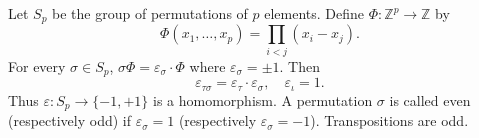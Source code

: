 Let $S_p$ be the group of permutations of $p$ elements. Define $\Phi: \mathbb{Z}^p \to \mathbb{Z}$ by
$$\Phi(x_1, \ldots, x_p) = \prod_{i < j} (x_i - x_j).$$
For every $\sigma \in S_p$, $\sigma\Phi = \varepsilon_\sigma \cdot \Phi$ where $\varepsilon_\sigma = \pm 1$. Then
$$\varepsilon_{\tau\sigma} = \varepsilon_\tau \cdot \varepsilon_\sigma, \quad \varepsilon_\iota = 1.$$
Thus $\varepsilon: S_p \to \{-1, +1\}$ is a homomorphism. A permutation $\sigma$ is called even (respectively odd) if $\varepsilon_\sigma = 1$ (respectively $\varepsilon_\sigma = -1$). Transpositions are odd.
